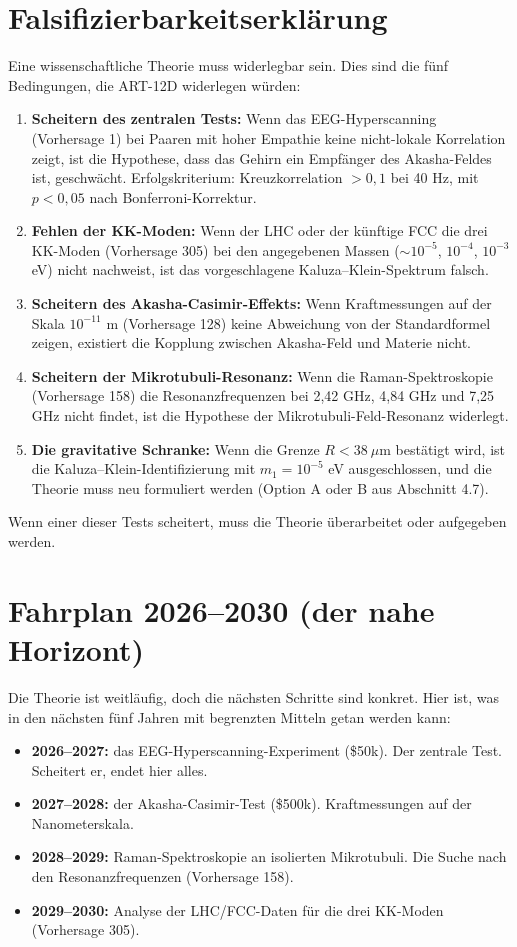 \section{Falsifizierbarkeitserklärung}
Eine wissenschaftliche Theorie muss widerlegbar sein. Dies sind die fünf Bedingungen, die ART-12D widerlegen würden:
\begin{enumerate}
    \item \textbf{Scheitern des zentralen Tests:} Wenn das EEG-Hyperscanning (Vorhersage 1) bei Paaren mit hoher Empathie keine nicht-lokale Korrelation zeigt, ist die Hypothese, dass das Gehirn ein Empfänger des Akasha-Feldes ist, geschwächt. Erfolgskriterium: Kreuzkorrelation $> 0,1$ bei 40 Hz, mit $p < 0,05$ nach Bonferroni-Korrektur.
    \item \textbf{Fehlen der KK-Moden:} Wenn der LHC oder der künftige FCC die drei KK-Moden (Vorhersage 305) bei den angegebenen Massen ($\sim 10^{-5}$, $10^{-4}$, $10^{-3}$ eV) nicht nachweist, ist das vorgeschlagene Kaluza--Klein-Spektrum falsch.
    \item \textbf{Scheitern des Akasha-Casimir-Effekts:} Wenn Kraftmessungen auf der Skala $10^{-11}$ m (Vorhersage 128) keine Abweichung von der Standardformel zeigen, existiert die Kopplung zwischen Akasha-Feld und Materie nicht.
    \item \textbf{Scheitern der Mikrotubuli-Resonanz:} Wenn die Raman-Spektroskopie (Vorhersage 158) die Resonanzfrequenzen bei 2,42 GHz, 4,84 GHz und 7,25 GHz nicht findet, ist die Hypothese der Mikrotubuli-Feld-Resonanz widerlegt.
    \item \textbf{Die gravitative Schranke:} Wenn die Grenze $R < 38\ \mu$m bestätigt wird, ist die Kaluza--Klein-Identifizierung mit $m_1 = 10^{-5}$ eV ausgeschlossen, und die Theorie muss neu formuliert werden (Option A oder B aus Abschnitt 4.7).
\end{enumerate}
Wenn einer dieser Tests scheitert, muss die Theorie überarbeitet oder aufgegeben werden.

\section{Fahrplan 2026--2030 (der nahe Horizont)}
Die Theorie ist weitläufig, doch die nächsten Schritte sind konkret. Hier ist, was in den nächsten fünf Jahren mit begrenzten Mitteln getan werden kann:
\begin{itemize}
    \item \textbf{2026--2027:} das EEG-Hyperscanning-Experiment (\$50k). Der zentrale Test. Scheitert er, endet hier alles.
    \item \textbf{2027--2028:} der Akasha-Casimir-Test (\$500k). Kraftmessungen auf der Nanometerskala.
    \item \textbf{2028--2029:} Raman-Spektroskopie an isolierten Mikrotubuli. Die Suche nach den Resonanzfrequenzen (Vorhersage 158).
    \item \textbf{2029--2030:} Analyse der LHC/FCC-Daten für die drei KK-Moden (Vorhersage 305).
\end{itemize}

\newpage
